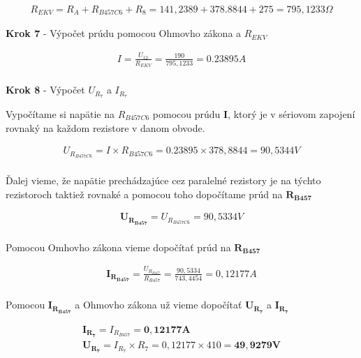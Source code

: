 \begin{gather*}
    R_{EKV} = R_{A} + R_{B457C6} + R_{8} = 141,2389 + 378.8844 + 275 = 795,1233 \Omega
\end{gather*}

\newpage

\begin{center}
\textbf{Krok 7} - Výpočet prúdu pomocou Ohmovho zákona a $R_{EKV}$
\end{center}

\begin{gather*}
   I = \frac {U_{12}} {R_{EKV}} = \frac {190} {795,1233} = 0.23895 A \\
\end{gather*}

\begin{center}
\textbf{Krok 8} - Výpočet $U_{R_{7}}$ a $I_{R_{7}}$
\end{center}

Vypočítame si napätie na $R_{B457C6}$ pomocou prúdu $\boldsymbol{I}$, ktorý je v sériovom zapojení rovnaký na každom rezistore v danom obvode.

\begin{gather*}
    U_{R_{B457C6}} = I \times R_{B457C6} = 0.23895 \times 378,8844 = 90,5344 V \\
\end{gather*}

\noindent Ďalej vieme, že napätie prechádzajúce cez paralelné rezistory je na týchto rezistoroch taktiež rovnaké a pomocou toho dopočítame prúd na $\boldsymbol{R_{B457}}$

\begin{gather*}
    \boldsymbol{U_{R_{B457}}} = U_{R_{B457C6}} = 90,5334 V \\
\end{gather*}

\noindent Pomocou Omhovho zákona vieme dopočítať prúd na $\boldsymbol{R_{B457}}$

\begin{gather*}
   \boldsymbol{I_{R_{B457}}} = \frac {U_{R_{B457}}} {R_{B457}} = \frac{90,5334} {743,4454} = 0,12177 A \\
\end{gather*}

\noindent Pomocou $\boldsymbol{I_{R_{B457}}}$ a Ohmovho zákona už vieme dopočítať $\boldsymbol{U_{R_{7}}}$ a $\boldsymbol{I_{R_{7}}}$

\begin{gather*}
   \boldsymbol{I_{R_{7}}} = I_{R_{B457}} = \boldsymbol{0,12177 A} \\
   \boldsymbol{U_{R_{7}}} = I_{R_{7}} \times {R_{7}} = 0,12177 \times 410 = \boldsymbol{49,9279 V} \\
\end{gather*}

 

